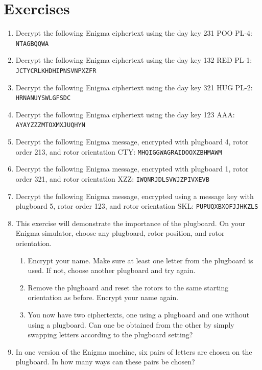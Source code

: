 \documentclass{book}
\theoremstyle{plain}
\theoremstyle{definition}
\newif\ifprintsolutions
\newcommand{\solution}[1]{\ifprintsolutions \begin{sloppypar}{\it #1}\end{sloppypar} \fi} %
\newcommand{\ciphertext}[1]{\texttt{#1}} %
\begin{document}
\section{Exercises}
\begin{enumerate}
\item Decrypt the following Enigma ciphertext using the day key 231 POO PL-4: \ciphertext{NTAGBQQWA} \solution{polar bear}
\item Decrypt the following Enigma ciphertext using the day key 132 RED PL-1: \ciphertext{JCTYCRLKHDHIPNSVNPXZFR} \solution{whowho (key 132 WHO PL-1) who let the dogs out}
\item Decrypt the following Enigma ciphertext using the day key 321 HUG PL-2: \ciphertext{HRNANUYSWLGFSDC} \solution{you shall not pass}
\item Decrypt the following Enigma ciphertext using the day key 123 AAA: \ciphertext{AYAYZZZMTOXMXJUQHYN} \solution{not nonsense (key 123 NSE) well done}
\item Decrypt the following Enigma message, encrypted with plugboard 4, rotor order 213, and rotor orientation CTY: \ciphertext{MHQIGGWAGRAIDOOXZBHMAWM} \solution{Passionfruit is cancelled.}
\item Decrypt the following Enigma message, encrypted with plugboard 1, rotor order 321, and rotor orientation XZZ: \ciphertext{IWQNRJDLSVWJZPIVXEVB} \solution{``Hitchhiker" is mediocre.}
\item Decrypt the following Enigma message, encrypted using a message key with plugboard 5, rotor order 123, and rotor orientation SKL: \ciphertext{PUPUQXBXOFJJHKZLS} \solution{HHGHHG please panic}
\item This exercise will demonstrate the importance of the plugboard. On your Enigma simulator, choose any plugboard, rotor position, and rotor orientation.
\begin{enumerate}
\item Encrypt your name. Make sure at least one letter from the plugboard is used. If not, choose another plugboard and try again.
\item Remove the plugboard and reset the rotors to the same starting orientation as before. Encrypt your name again.
\item You now have two ciphertexts, one using a plugboard and one without using a plugboard. Can one be obtained from the other by simply swapping letters according to the plugboard setting?
\end{enumerate}
\item In one version of the Enigma machine, six pairs of letters are chosen on the plugboard. In how many ways can these pairs be chosen? \solution{The pairs can be chosen in $\binom{26}{2}\binom{24}{2}\cdots\binom{16}{2}/6! = 100391791500$ ways.}

\end{enumerate}
\end{document}
